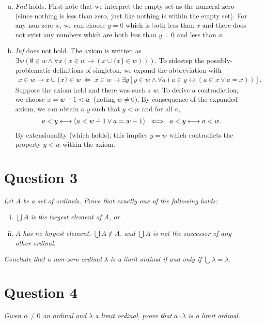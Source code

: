 \documentclass[a4paper]{article}
\def\dotminus{\mathbin{\ooalign{\hss\raise1ex\hbox{.}\hss\cr
  \mathsurround=0pt$-$}}}
\begin{document}
\begin{enumerate}[a)]
  \item \textit{Fnd} holds.
    First note that we interpret the empty set as the numeral zero (since nothing is less than zero, just like nothing is within the empty set).
    For any non-zero $x$, we can choose $y = 0$ which is both less than $x$ and
    there does not exist any numbers which are both less than $y = 0$
    and less than $x$.
  \item \textit{Inf} does not hold. The axiom is written as
    $\exists w(\emptyset \in w \wedge \forall x(x \in w \longrightarrow (x \cup \{x\} \in w)))$.
    To sidestep the possibly-problematic definitions of singleton, we expand the abbreviation with
    \begin{align*}
      x \in w \longrightarrow x \cup \{x\} \in w 
      ~\iff~
      x \in w \longrightarrow\exists y\left[y \in w \wedge \forall a(a \in y \longleftrightarrow (a \in x \vee a = x))\right].
    \end{align*}
    Suppose the axiom held and there was such a $w$. To derive a contradiction,
    we choose $x = w \dotminus 1 < w$ (noting $w \ne 0$).
    By consequence of the expanded axiom, we can obtain a $y$
    such that $y < w$ and for all $a$,
    \begin{align*}
    a < y \longleftrightarrow (a < w \dotminus 1 \vee a = w \dotminus 1) 
    ~\iff~
    a < y \longleftrightarrow a < w.
    \end{align*}
    By extensionality (which holds), this implies $y = w$ which contradicts
    the property $y < w$ within the axiom.
\end{enumerate}


\section*{Question 3}
  \textit{Let $A$ be a set of ordinals. Prove that exactly one of the following holds:}
  \begin{enumerate}[(i)]
    \item \textit{$\bigcup A$ is the largest element of $A$, or}
    \item \textit{$A$ has no largest element, $\bigcup A \notin A$, and 
      $\bigcup A$ is not the successor of any other ordinal.}
  \end{enumerate}
  \textit{Conclude that a non-zero ordinal $\lambda$ is a limit ordinal if and only if
  $\bigcup \lambda = \lambda$.}



\section*{Question 4}
\begin{center}
  \textit{Given $\alpha \ne 0$ an ordinal and $\lambda$ a limit ordinal,
  prove that $a \cdot \lambda$ is a limit ordinal.}
\end{center}
\end{document}
